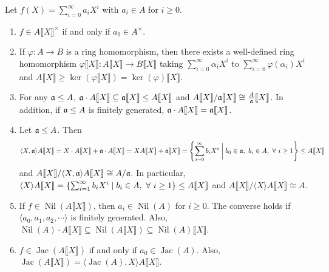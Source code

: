 \begin{proposition}\label{1.68}
    Let $f(X) = \sum_{i=0}^\infty a_iX^i$ with $a_i \in A$ for $i \geq 0$.
    \begin{enumerate}
        \item $f \in A \llbracket X \rrbracket^\times$ if and only if $a_0 \in A^\times$.
        \item If $\varphi: A \to B$ is a ring homomorphism, then there exists a well-defined ring homomorphism $\varphi\llbracket X \rrbracket: A\llbracket X \rrbracket \to B\llbracket X \rrbracket$ taking $\sum_{i=0}^\infty \alpha_iX^i$ to $\sum_{i=0}^\infty \varphi(\alpha_i)X^i$ and $A\llbracket X \rrbracket \geq \ker(\varphi \llbracket X \rrbracket) = \ker(\varphi)\llbracket X \rrbracket$. 
        \item For any $\mathfrak{a} \leq A$, $\mathfrak{a} \cdot A \llbracket X \rrbracket \subseteq \mathfrak{a} \llbracket X \rrbracket \leq A\llbracket X \rrbracket$ and $A \llbracket X \rrbracket / \mathfrak{a} \llbracket X \rrbracket \cong \frac{A}{\mathfrak{a}} \llbracket X \rrbracket$. In addition, if $\mathfrak{a} \leq A$ is finitely generated, $\mathfrak{a} \cdot A\llbracket X \rrbracket = \mathfrak{a} \llbracket X \rrbracket$.
        \item Let $\mathfrak{a} \leq A$. Then 
            \[\langle X,\mathfrak{a} \rangle A\llbracket X \rrbracket = X \cdot A \llbracket X \rrbracket + \mathfrak{a} \cdot A \llbracket X \rrbracket = XA \llbracket X \rrbracket + \mathfrak{a} \llbracket X \rrbracket = \left\{\sum_{i=0}^\infty b_iX^i \mathrel{\bigg |} b_0 \in \mathfrak{a},\ b_i \in A, \ \forall \  i \geq 1\right\} \leq A \llbracket X \rrbracket\] 
            and $A \llbracket X \rrbracket / \langle X,\mathfrak{a} \rangle A \llbracket X \rrbracket \cong A/\mathfrak{a}$. In particular, $\langle X \rangle A \llbracket X \rrbracket = \{\sum_{i=1}^\infty b_iX^i \mid b_i \in A, \ \forall \  i \geq 1\} \leq A\llbracket X \rrbracket$ and $A\llbracket X \rrbracket / \langle X \rangle A \llbracket X \rrbracket \cong A$. 
        \item If $f \in \operatorname{Nil}(A\llbracket X \rrbracket)$, then $a_i \in \operatorname{Nil}(A)$ for $i \geq 0$. The converse holds if $\langle a_0,a_1,a_2,\cdots \rangle$ is finitely generated. Also, $\operatorname{Nil}(A) \cdot A \llbracket X \rrbracket \subseteq \operatorname{Nil}(A \llbracket X \rrbracket) \subseteq \operatorname{Nil}(A) \llbracket X \rrbracket$.
        \item $f \in \operatorname{Jac}(A\llbracket X \rrbracket)$ if and only if $a_0 \in \operatorname{Jac}(A)$. Also, $\operatorname{Jac}(A\llbracket X \rrbracket) = \langle \operatorname{Jac}(A),X \rangle A\llbracket X \rrbracket$. 

\end{enumerate}
\end{proposition}

